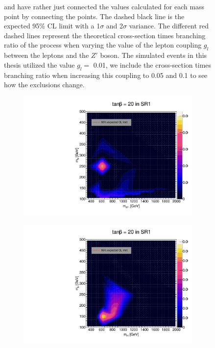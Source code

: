 \documentclass[12pt, a4paper]{book}
\begin{document}
\begin{figure}[!ht]
{   and have rather just connected the values calculated for each mass point by connecting the points. The dashed black line is the expected 95\% CL limit with a 1$\sigma$ and 2$\sigma$ variance. 
   The different red dashed lines represent the theoretical cross-section times branching ratio of the process when varying the value of the lepton coupling $g_l$ between the leptons and the $Z'$ boson. The simulated events in this thesis utilized the value $g_l=$ 0.01, we include the cross-section times branching ratio when increasing this coupling to 0.05 and 0.1 to see how the exclusions change.  }\label{fig:EFT_LDS_exclusion_ee_uu}
\end{figure}

\begin{figure}[!ht]
	\centering
	\begin{subfigure}[b]{0.49\textwidth}
      \centering
      \includegraphics[width=1\textwidth]{Limits/Model_independent/50-100/2HDM/2HDM_ee_tb20.pdf}
   \end{subfigure}
   \hfill
   \begin{subfigure}[b]{0.49\textwidth}
      \centering
      \includegraphics[width=1\textwidth]{Limits/Model_independent/50-100/2HDM/2HDM_uu_tb20.pdf}

\end{subfigure}
\end{figure}
\end{document}
